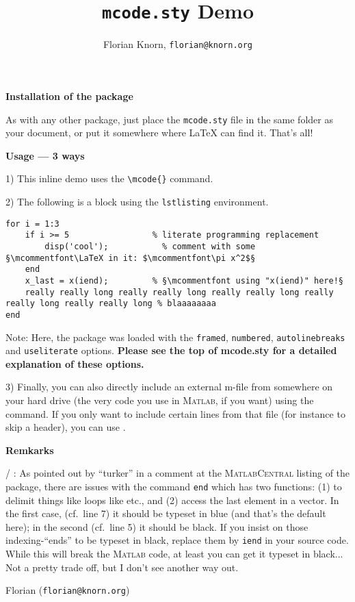 \documentclass{article}
\title{\texttt{mcode.sty} Demo}
\author{Florian Knorn, \texttt{florian@knorn.org}}
\begin{document}
\maketitle

\textbf{Installation of the package}

As with any other package, just place the \verb|mcode.sty| file in the
same folder as your document, or put it somewhere where \LaTeX{} can
find it.  That's all!

\medskip

\textbf{Usage --- 3 ways}

1) This inline demo  uses the
\verb|\mcode{}| command.

2) The following is a block using the \verb|lstlisting| environment.
\begin{lstlisting}
for i = 1:3
	if i >= 5                 % literate programming replacement
		disp('cool');           % comment with some §\mcommentfont\LaTeX in it: $\mcommentfont\pi x^2$§
	end
	x_last = x(iend);         % §\mcommentfont using "x(iend)" here!§
	really really long really really long really really long really really long really really long % blaaaaaaaa
end
\end{lstlisting}
Note: Here, the package was loaded with the \verb|framed|, \verb|numbered|, \verb|autolinebreaks| and \verb|useliterate| options.  \textbf{Please see the top of mcode.sty for a detailed explanation of these options.}


3) Finally, you can also directly include an external m-file from somewhere on your hard drive (the very code you use in \textsc{Matlab}, if you want) using the \verb|| command.  If you only want to include certain lines from that file (for instance to skip a header), you can use \verb||.

\medskip

\textbf{Remkarks}

 / : As pointed out by ``turker'' in a comment at the \textsc{MatlabCentral} listing of the package, there are issues with the command \texttt{end} which has two functions: (1) to delimit things like loops like  etc., and (2) access the last element in a vector.  In the first case, (cf.\ line 7) it should be typeset in blue (and that's the default here); in the second (cf.\ line 5) it should be black.   If you insist on those indexing-``ends'' to be typeset in black, replace them by \texttt{iend} in your source code.  While this will break the \textsc{Matlab} code, at least you can get it typeset in black... Not a pretty trade off, but I don't see another way out.


Florian (\texttt{florian@knorn.org})
\end{document}
